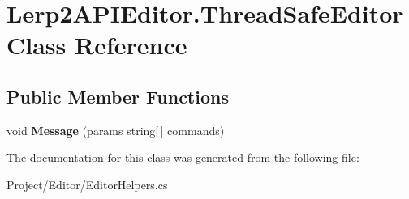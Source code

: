 \hypertarget{class_lerp2_a_p_i_editor_1_1_thread_safe_editor}{}\section{Lerp2\+A\+P\+I\+Editor.\+Thread\+Safe\+Editor Class Reference}
\label{class_lerp2_a_p_i_editor_1_1_thread_safe_editor}
\subsection*{Public Member Functions}
\begin{DoxyCompactItemize}
\item 
\mbox{\label{class_lerp2_a_p_i_editor_1_1_thread_safe_editor_a3e1b599ef5271b01d0ff5ef2a66dc83b}} 
void {\bfseries Message} (params string\mbox{[}$\,$\mbox{]} commands)
\end{DoxyCompactItemize}


The documentation for this class was generated from the following file\+:\begin{DoxyCompactItemize}
\item 
Project/\+Editor/Editor\+Helpers.\+cs\end{DoxyCompactItemize}
